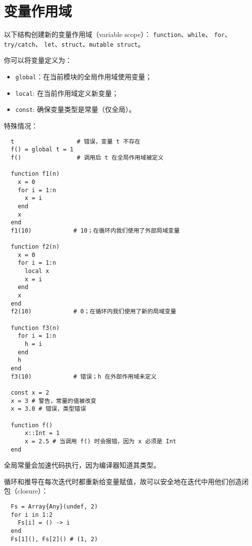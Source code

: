\documentclass[10pt,a4paper]{article}
\begin{document}
\section{变量作用域}
以下结构创建新的变量作用域（variable scope）：
\lstinline|function|、\lstinline|while|、
\lstinline|for|、\lstinline|try/catch|、
\lstinline|let|、\lstinline|struct|、\lstinline|mutable struct|。

你可以将变量定义为：
\begin{itemize}
  \item \lstinline|global|：在当前模块的全局作用域使用变量；
  \item \lstinline|local|: 在当前作用域定义新变量；
  \item \lstinline|const|: 确保变量类型是常量（仅全局）。
\end{itemize}

特殊情况：
\begin{lstlisting}
  t                  # 错误，变量 t 不存在
  f() = global t = 1
  f()                # 调用后 t 在全局作用域被定义

  function f1(n)
    x = 0
    for i = 1:n
      x = i
    end
    x
  end
  f1(10)            # 10；在循环内我们使用了外部局域变量

  function f2(n)
    x = 0
    for i = 1:n
      local x
      x = i
    end
    x
  end
  f2(10)            # 0；在循环内我们使用了新的局域变量

  function f3(n)
    for i = 1:n
      h = i
    end
    h
  end
  f3(10)            # 错误；h 在外部作用域未定义

  const x = 2
  x = 3 # 警告，常量的值被改变
  x = 3.0 # 错误，类型错误

  function f()
      x::Int = 1
      x = 2.5 # 当调用 f() 时会报错，因为 x 必须是 Int
  end
\end{lstlisting}
全局常量会加速代码执行，因为编译器知道其类型。

循环和推导在每次迭代时都重新给变量赋值，故可以安全地在迭代中用他们创造闭包（closure）：
\begin{lstlisting}
  Fs = Array{Any}(undef, 2)
  for i in 1:2
    Fs[i] = () -> i
  end
  Fs[1](), Fs[2]() # (1, 2)
\end{lstlisting}
\end{document}
